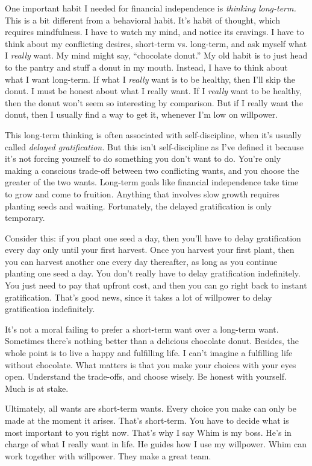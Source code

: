 One important habit I needed for financial independence is \emph{thinking long-term.} This is a bit different from a behavioral habit. It's habit of thought, which requires mindfulness. I have to watch my mind, and notice its cravings. I have to think about my conflicting desires, short-term vs. long-term, and ask myself what I \emph{really} want. My mind might say, ``chocolate donut.'' My old habit is to just head to the pantry and stuff a donut in my mouth. Instead, I have to think about what I want long-term. If what I \emph{really} want is to be healthy, then I'll skip the donut. I must be honest about what I really want. If I \emph{really} want to be healthy, then the donut won't seem so interesting by comparison. But if I really want the donut, then I usually find a way to get it, whenever I'm low on willpower.

This long-term thinking is often associated with self-discipline, when it's usually called \emph{delayed gratification.} But this isn't self-discipline as I've defined it because it's not forcing yourself to do something you don't want to do. You're only making a conscious trade-off between two conflicting wants, and you choose the greater of the two wants. Long-term goals like financial independence take time to grow and come to fruition. Anything that involves slow growth requires planting seeds and waiting. Fortunately, the delayed gratification is only temporary.

Consider this: if you plant one seed a day, then you'll have to delay gratification every day only until your first harvest. Once you harvest your first plant, then you can harvest another one every day thereafter, as long as you continue planting one seed a day. You don't really have to delay gratification indefinitely. You just need to pay that upfront cost, and then you can go right back to instant gratification. That's good news, since it takes a lot of willpower to delay gratification indefinitely.

It's not a moral failing to prefer a short-term want over a long-term want. Sometimes there's nothing better than a delicious chocolate donut. Besides, the whole point is to live a happy and fulfilling life. I can't imagine a fulfilling life without chocolate. What matters is that you make your choices with your eyes open. Understand the trade-offs, and choose wisely. Be honest with yourself. Much is at stake.

Ultimately, all wants are short-term wants. Every choice you make can only be made at the moment it arises. That's short-term. You have to decide what is most important to you right now. That's why I say Whim is my boss. He's in charge of what I really want in life. He guides how I use my willpower. Whim can work together with willpower. They make a great team.

